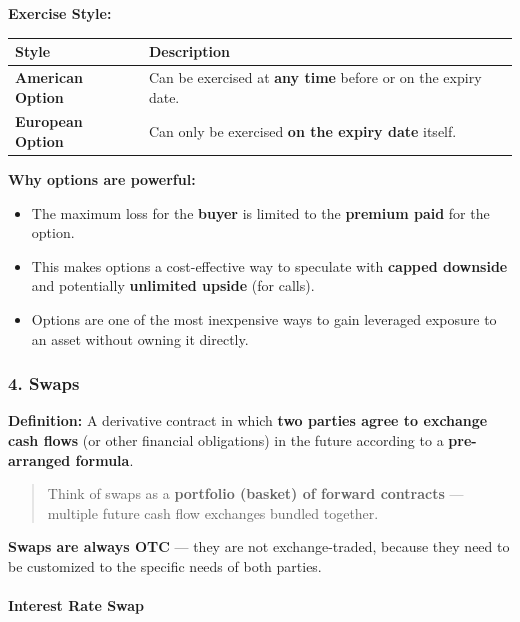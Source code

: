 \documentclass[12pt,openany]{book}
\begin{document}
\textbf{Exercise Style:}

\begin{center}
\small
\renewcommand{\arraystretch}{1.2}
\begin{tabular}{|L{0.26\textwidth}|L{0.64\textwidth}|}
\hline
\textbf{Style} & \textbf{Description} \\ \hline
\textbf{American Option} & Can be exercised at \textbf{any time} before or on the expiry date. \\ \hline
\textbf{European Option} & Can only be exercised \textbf{on the expiry date} itself. \\ \hline
\end{tabular}
\end{center}

\textbf{Why options are powerful:}
\begin{itemize}[leftmargin=*]
    \item The maximum loss for the \textbf{buyer} is limited to the \textbf{premium paid} for the option.
    \item This makes options a cost-effective way to speculate with \textbf{capped downside} and potentially \textbf{unlimited upside} (for calls).
    \item Options are one of the most inexpensive ways to gain leveraged exposure to an asset without owning it directly.
\end{itemize}

\subsubsection{4. Swaps}

\textbf{Definition:} A derivative contract in which \textbf{two parties agree to exchange cash flows} (or other financial obligations) in the future according to a \textbf{pre-arranged formula}.

\begin{quote}
    Think of swaps as a \textbf{portfolio (basket) of forward contracts} --- multiple future cash flow exchanges bundled together.
\end{quote}

\textbf{Swaps are always OTC} --- they are not exchange-traded, because they need to be customized to the specific needs of both parties.

\paragraph{Interest Rate Swap}
\end{document}
